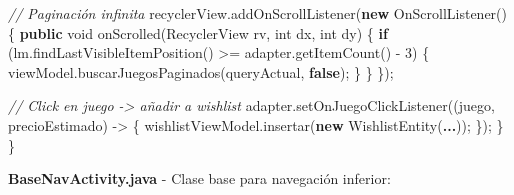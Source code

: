 \documentclass[
  spanish,
  11pt,
  paper=a4,
  ,captions=tableheading
]{scrartcl}
\newenvironment{Shaded}{}{}
\newcommand{\CommentTok}[1]{\textcolor[rgb]{0.38,0.63,0.69}{\textit{#1}}}
\newcommand{\ControlFlowTok}[1]{\textcolor[rgb]{0.00,0.44,0.13}{\textbf{#1}}}
\newcommand{\DataTypeTok}[1]{\textcolor[rgb]{0.56,0.13,0.00}{#1}}
\newcommand{\DecValTok}[1]{\textcolor[rgb]{0.25,0.63,0.44}{#1}}
\newcommand{\FunctionTok}[1]{\textcolor[rgb]{0.02,0.16,0.49}{#1}}
\newcommand{\KeywordTok}[1]{\textcolor[rgb]{0.00,0.44,0.13}{\textbf{#1}}}
\newcommand{\NormalTok}[1]{#1}
\newcommand{\OperatorTok}[1]{\textcolor[rgb]{0.40,0.40,0.40}{#1}}
\begin{document}
\begin{Shaded}
\begin{Highlighting}[]
        \CommentTok{// Paginación infinita}
\NormalTok{        recyclerView}\OperatorTok{.}\FunctionTok{addOnScrollListener}\OperatorTok{(}\KeywordTok{new} \FunctionTok{OnScrollListener}\OperatorTok{()} \OperatorTok{\{}
            \KeywordTok{public} \DataTypeTok{void} \FunctionTok{onScrolled}\OperatorTok{(}\NormalTok{RecyclerView rv}\OperatorTok{,} \DataTypeTok{int}\NormalTok{ dx}\OperatorTok{,} \DataTypeTok{int}\NormalTok{ dy}\OperatorTok{)} \OperatorTok{\{}
                \ControlFlowTok{if} \OperatorTok{(}\NormalTok{lm}\OperatorTok{.}\FunctionTok{findLastVisibleItemPosition}\OperatorTok{()} \OperatorTok{\textgreater{}=}\NormalTok{ adapter}\OperatorTok{.}\FunctionTok{getItemCount}\OperatorTok{()} \OperatorTok{{-}} \DecValTok{3}\OperatorTok{)} \OperatorTok{\{}
\NormalTok{                    viewModel}\OperatorTok{.}\FunctionTok{buscarJuegosPaginados}\OperatorTok{(}\NormalTok{queryActual}\OperatorTok{,} \KeywordTok{false}\OperatorTok{);}
                \OperatorTok{\}}
            \OperatorTok{\}}
        \OperatorTok{\});}

        \CommentTok{// Click en juego {-}\textgreater{} añadir a wishlist}
\NormalTok{        adapter}\OperatorTok{.}\FunctionTok{setOnJuegoClickListener}\OperatorTok{((}\NormalTok{juego}\OperatorTok{,}\NormalTok{ precioEstimado}\OperatorTok{)} \OperatorTok{{-}\textgreater{}} \OperatorTok{\{}
\NormalTok{            wishlistViewModel}\OperatorTok{.}\FunctionTok{insertar}\OperatorTok{(}\KeywordTok{new} \FunctionTok{WishlistEntity}\OperatorTok{(}\KeywordTok{...}\OperatorTok{));}
        \OperatorTok{\});}
    \OperatorTok{\}}
\OperatorTok{\}}
\end{Highlighting}
\end{Shaded}

\textbf{BaseNavActivity.java} - Clase base para navegación inferior:
\end{document}
